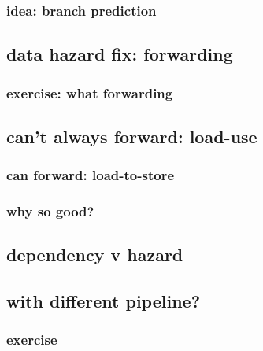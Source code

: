 \subsubsection{idea: branch prediction}


\subsection{data hazard fix: forwarding}


\subsubsection{exercise: what forwarding}


\subsection{can't always forward: load-use}


\subsubsection{can forward: load-to-store}




\subsubsection{why so good?}



\subsection{dependency v hazard}




\subsection{with different pipeline?}


\subsubsection{exercise}


